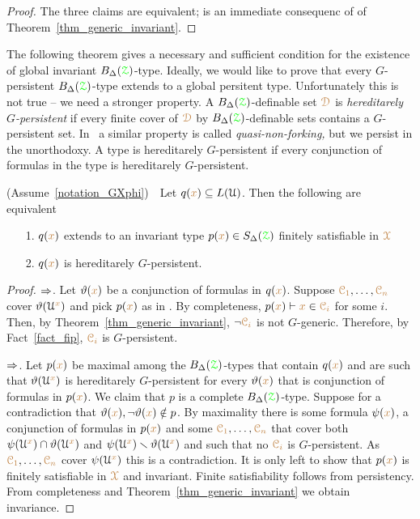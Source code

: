 \begin{proof}
  The three claims are equivalent;  is an immediate consequenc of  of Theorem~\ref{thm_generic_invariant}.
\end{proof}

The following theorem gives a necessary and sufficient condition for the  existence of global invariant $B_\Delta({{\color{green}\EuScript Z}})$-type.
Ideally, we would like to prove that every $G$-persistent $B_\Delta({{\color{green}\EuScript Z}})$-type extends to a global persitent type.
Unfortunately this is not true -- we need a stronger property.
A $B_\Delta({{\color{green}\EuScript Z}})$-definable set ${\color{brown}\EuScript D}$ is \emph{hereditarely $G$-persistent\/} if every finite cover of ${\color{brown}\EuScript D}$ by $B_\Delta({{\color{green}\EuScript Z}})$-definable sets contains a $G$-persistent set.
In~\cite{CK} a similar property is called \textit{quasi-non-forking,} but we persist in the unorthodoxy.
A type is hereditarely $G$-persistent if every conjunction of formulas in the type is hereditarely $G$-persistent.

\begin{theorem}\label{thm_generic_invariant2}
  (Assume~\ref{notation_GXphi})\ \  
  Let $q({\color{brown} x})\subseteq L(\EuScript U)$.
  Then the following are equivalent 
  \begin{itemize}
    \item[1.] $q({\color{brown} x})$ extends to an invariant type $p({\color{brown} x})\in S_\Delta({\color{green}\EuScript Z})$ finitely satisfiable in ${\color{brown}\EuScript X}$
    \item[2.] $q({\color{brown} x})$ is hereditarely $G$-persistent.
  \end{itemize}
\end{theorem}

\begin{proof}
  $\Rightarrow$.
  Let $\vartheta({\color{brown} x})$ be a conjunction of formulas in $q({\color{brown} x})$.
  Suppose ${\color{brown}\EuScript C_1},\dots,{\color{brown}\EuScript C_n}$ cover $\vartheta(\EuScript U^{\color{brown} x})$ and pick $p({\color{brown} x})$ as in .
  By completeness, $p({\color{brown} x})\vdash {\color{brown}x}\in{\color{brown}\EuScript C_i}$ for some $i$.
  Then, by Theorem~\ref{thm_generic_invariant}, $\neg{\color{brown}\EuScript C_i}$ is not $G$-generic.
  Therefore, by Fact~\ref{fact_fip}, ${\color{brown}\EuScript C_i}$ is $G$-persistent.

  $\Rightarrow$.
  Let $p({\color{brown} x})$ be maximal among the $B_\Delta({{\color{green}\EuScript Z}})$-types that contain $q({\color{brown} x})$ and are such that $\vartheta(\EuScript U^{\color{brown} x})$ is hereditarely $G$-persistent for every $\vartheta({\color{brown} x})$ that is conjunction of formulas in $p({\color{brown} x})$.
  We claim that $p$ is a complete $B_\Delta({{\color{green}\EuScript Z}})$-type.
  Suppose for a contradiction that $\vartheta({\color{brown} x}),\neg\vartheta({\color{brown} x})\notin p$.
  By maximality there is some formula $\psi({\color{brown} x})$, a conjunction of formulas in $p({\color{brown} x})$ and some ${\color{brown}\EuScript C_1},\dots,{\color{brown}\EuScript C_n}$ that cover both $\psi(\EuScript U^{\color{brown} x})\cap\vartheta(\EuScript U^{\color{brown} x})$ and $\psi(\EuScript U^{\color{brown} x})\smallsetminus\vartheta(\EuScript U^{\color{brown} x})$ and such that no ${\color{brown}\EuScript C_i}$ is $G$-persistent.
  As ${\color{brown}\EuScript C_1},\dots,{\color{brown}\EuScript C_n}$ cover $\psi(\EuScript U^{\color{brown} x})$ this is a contradiction.
  It is only left to show that $p({\color{brown} x})$ is finitely satisfiable in ${\color{brown}\EuScript X}$ and invariant.
  Finite satisfiability follows from persistency.
  From completeness and Theorem~\ref{thm_generic_invariant} we obtain invariance.
\end{proof}


